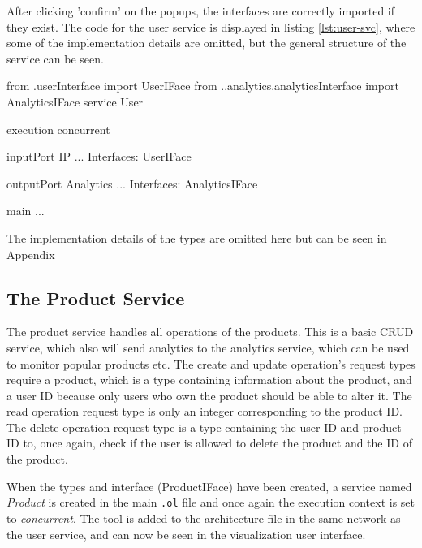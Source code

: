 After clicking 'confirm' on the popups, the interfaces are correctly imported if they exist. The code for the user service is displayed in
listing \ref*{lst:user-svc}, where some of the implementation details are omitted, but the general structure of the service can be seen.

\begin{jolisting}[][caption={The user service after the ports have been created with omitted implementation details.}, label={lst:user-svc}]
from .userInterface import UserIFace
from ..analytics.analyticsInterface import AnalyticsIFace
service User {

    execution{ concurrent }

    inputPort IP {
        ...
        Interfaces: UserIFace
    }

    outputPort Analytics {
        ...
        Interfaces: AnalyticsIFace
    }

    main {
        ...
    }
}
\end{jolisting}

The implementation details of the types are omitted here but can be seen in Appendix %

\subsection{The Product Service}
The product service handles all operations of the products. This is a basic CRUD service, which also will send analytics to the analytics service, which can be used to monitor popular products etc.
The create and update operation's request types require a product, which is a type containing information about the product, and a user ID because only users who own the product should be able to alter it.
The read operation request type is only an integer corresponding to the product ID. The delete operation request type is a type containing the user ID and product ID to, once again, check if the user is allowed to delete the product and the ID of the product.

When the types and interface (ProductIFace) have been created,
a service named \textit{Product} is created in the main \texttt{.ol} file and once again the execution context is set to \textit{concurrent}.
The tool is added to the architecture file in the same network as the user service, and can now be seen in the visualization user interface.

